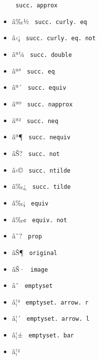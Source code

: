 \begin{itemize}
{  \texttt{\ succ.\ approx\ }}
\item
  \label{symbol-succ.curly.eq}{{ â‰½ }
  \texttt{\ succ.\ curly.\ eq\ }}
\item
  \label{symbol-succ.curly.eq.not}{{ â‹¡ }
  \texttt{\ succ.\ curly.\ eq.\ not\ }}
\item
  \label{symbol-succ.double}{{ âª¼ }
  \texttt{\ succ.\ double\ }}
\item
  \label{symbol-succ.eq}{{ âª° } \texttt{\ succ.\ eq\ }}
\item
  \label{symbol-succ.equiv}{{ âª´ }
  \texttt{\ succ.\ equiv\ }}
\item
  \label{symbol-succ.napprox}{{ âªº }
  \texttt{\ succ.\ napprox\ }}
\item
  \label{symbol-succ.neq}{{ âª² }
  \texttt{\ succ.\ neq\ }}
\item
  \label{symbol-succ.nequiv}{{ âª¶ }
  \texttt{\ succ.\ nequiv\ }}
\item
  \label{symbol-succ.not}{{ âŠ? }
  \texttt{\ succ.\ not\ }}
\item
  \label{symbol-succ.ntilde}{{ â‹© }
  \texttt{\ succ.\ ntilde\ }}
\item
  \label{symbol-succ.tilde}{{ â‰¿ }
  \texttt{\ succ.\ tilde\ }}
\item
  \label{symbol-equiv}{{ â‰¡ } \texttt{\ equiv\ }}
\item
  \label{symbol-equiv.not}{{ â‰¢ }
  \texttt{\ equiv.\ not\ }}
\item
  \label{symbol-prop}{{ âˆ? } \texttt{\ prop\ }}
\item
  \label{symbol-original}{{ âŠ¶ } \texttt{\ original\ }}
\item
  \label{symbol-image}{{ âŠ· } \texttt{\ image\ }}
\item
  \label{symbol-emptyset}{{ âˆ } \texttt{\ emptyset\ }}
\item
  \label{symbol-emptyset.arrow.r}{{ â¦³ }
  \texttt{\ emptyset.\ arrow.\ r\ }}
\item
  \label{symbol-emptyset.arrow.l}{{ â¦´ }
  \texttt{\ emptyset.\ arrow.\ l\ }}
\item
  \label{symbol-emptyset.bar}{{ â¦± }
  \texttt{\ emptyset.\ bar\ }}
\item
  \label{symbol-emptyset.circle}{{ â¦² }
}
\end{itemize}
